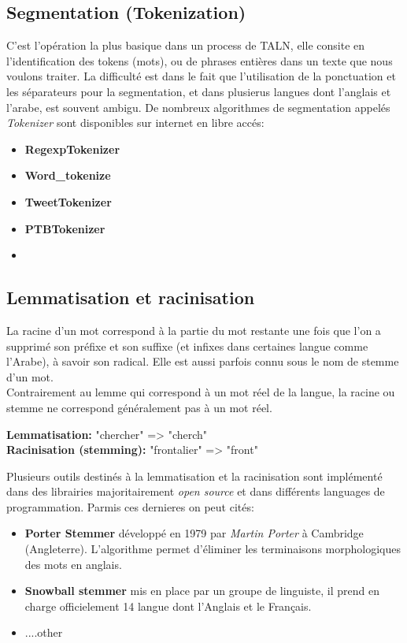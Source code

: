 \documentclass{report}
\begin{document}
\subsection{Segmentation (Tokenization)}
C'est l'opération la plus basique dans un process de TALN, elle consite en l'identification des tokens (mots), ou de phrases entières dans un texte que nous voulons traiter. La difficulté est dans le fait que l'utilisation de la ponctuation et les séparateurs pour la segmentation, et dans plusierus langues dont l'anglais et l'arabe, est souvent ambigu.     
De nombreux algorithmes de segmentation appelés \emph{Tokenizer} sont disponibles sur internet en libre accés:
\begin{itemize}
    \item \textbf{RegexpTokenizer} 
    \item \textbf{Word_tokenize}
    \item \textbf{TweetTokenizer} 
    \item \textbf{PTBTokenizer}
    \item
\end{itemize}




\subsection{Lemmatisation et racinisation}
La racine d’un mot correspond à la partie du mot restante une fois que l’on a supprimé son préfixe et son suffixe (et infixes dans certaines langue comme l'Arabe), à savoir son radical. Elle est aussi parfois connu sous le nom de stemme d’un mot.\\ 
Contrairement au lemme qui correspond à un mot réel de la langue, la racine ou stemme ne correspond généralement pas à un mot réel.

\textbf{Lemmatisation:} "chercher" => "cherch"\\
\textbf{Racinisation (stemming):} "frontalier" => "front"  

Plusieurs outils destinés à la lemmatisation et la racinisation sont implémenté dans des librairies majoritairement \emph{open source} et dans différents languages de programmation. Parmis ces dernieres on peut cités:
\begin{itemize}
    \item \textbf{Porter Stemmer} développé en 1979 par \emph{Martin Porter}  à Cambridge (Angleterre). 
    L'algorithme permet d'éliminer les terminaisons morphologiques des mots en anglais.
    \item \textbf{Snowball stemmer} mis en place par un groupe de linguiste, il prend en charge officielement 14 langue dont l'Anglais et le Français. 
    \item ....other
\end{itemize} 
\end{document}
